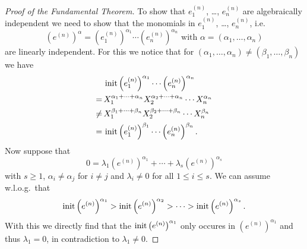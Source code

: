 \begin{proof}[Proof of the Fundamental Theorem]
  To show that $e^{(n)}_1$, \dots, $e^{(n)}_n$ are algebraically independent we need to show that the monomials in $e^{(n)}_1$, \dots, $e^{(n)}_n$, i.e.\
  \[
      \left(e^{(n)}\right)^\alpha
    = \left(e^{(n)}_1\right)^{\alpha_1} \dotsm \left(e^{(n)}_n\right)^{\alpha_n}
    \text{ with }
      \alpha
    = (\alpha_1, \dotsc, \alpha_n)
  \]
  are linearly independent.
  For this we notice that for $(\alpha_1, \dotsc, \alpha_n) \neq (\beta_1, \dotsc, \beta_n)$ we have
  \begin{align*}
        &\, \operatorname{init} \left(e^{(n)}_1\right)^{\alpha_1} \dotsm \left(e^{(n)}_n\right)^{\alpha_n}            \\
       =&\, X_1^{\alpha_1 + \dotsb + \alpha_n} X_2^{\alpha_2 + \dotsb + \alpha_n} \dotsm X_n^{\alpha_n} \\
    \neq&\, X_1^{\beta_1 + \dotsb + \beta_n} X_2^{\beta_2  + \dotsb + \beta_n} \dotsm X_n^{\beta_n}     \\
       =&\, \operatorname{init} \left(e^{(n)}_1\right)^{\beta_1} \dotsm \left(e^{(n)}_n\right)^{\beta_n}.
  \end{align*}
  Now suppose that
  \[
      0
    = \lambda_1 \left(e^{(n)}\right)^{\alpha_1} + \dotsb + \lambda_s \left(e^{(n)}\right)^{\alpha_s}
  \]
  with $s \geq 1$, $\alpha_i \neq \alpha_j$ for $i \neq j$ and $\lambda_i \neq 0$ for all $1 \leq i \leq s$.
  We can assume w.l.o.g.\ that 
  \[
      \operatorname{init} \left(e^{(n)}\right)^{\alpha_1}
    > \operatorname{init} \left(e^{(n)}\right)^{\alpha_2}
    > \dotsb > \operatorname{init} \left(e^{(n)}\right)^{\alpha_s}.
  \]
  With this we directly find that the $\operatorname{init} \left(e^{(n)}\right)^{\alpha_1}$ only occures in $\left(e^{(n)}\right)^{\alpha_1}$ and thus $\lambda_1 = 0$, in contradiction to $\lambda_1 \neq 0$.
\end{proof}


